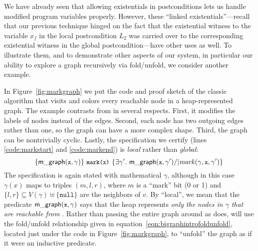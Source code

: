 

We have already seen that allowing existentials in postconditions lets us handle modified program
variables properly.  However, these ``linked existentials''---recall that our previous technique
hinged on the fact that the existential witness to the variable $x_f$ in the local postcondition
$L_2$ was carried over to the corresponding existential witness in the global postcondition---have
other uses as well.  To illustrate them, and to demonstrate other aspects of our system, in particular our ability to explore a graph recursively via fold/unfold, we consider another example.

In Figure~\ref{fig:markgraph} we put the code and proof sketch of the classic  algorithm that visits and colors every reachable node in a heap-represented graph.  The  example contrasts from  in several respects.  First, it modifies the labels of nodes instead of the edges.  Second, each node has two outgoing edges rather than one, so the graph can have a more complex shape.  Third, the graph can be nontrivially cyclic.  Lastly, the specification we certify (lines \ref{code:markstart} and \ref{code:markend}) is \emph{local} rather than \emph{global}:
\vspace*{-1ex}
\[
\{\p{m\_graph}(\li{x},\gamma)\}~\li{mark(x)}~\{\exists \gamma'.~ \p{m\_graph}(\li{x},\gamma') /| \m{mark}(\gamma, \li{x}, \gamma')\}
\vspace*{-1ex}
\]
The specification is again stated with mathematical $\gamma$, although in this case $\gamma(x)$ maps to triples $(m,l,r)$, where $m$ is a ``mark'' bit (0 or 1) and $\{l,r\} \subseteq V(\gamma) \uplus \{\mathtt{null}\}$ are the neighbors of $v$.  By ``local'', we mean that the predicate $\mathsf{m\_graph}({\texttt{\small x}},\gamma)$ says that the heap represents \emph{only the nodes in $\gamma$ that are reachable from }.  Rather than passing the entire graph around as  does,  will use the fold/unfold relationship given in equation~\eqref{eqn:bigraphintrofoldunfold}, located just under the code in Figure~\ref{fig:markgraph}, to ``unfold'' the graph as if it were an inductive predicate.

